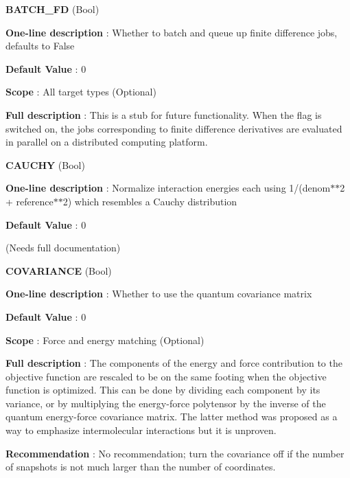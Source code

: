 \begin{DoxyItemize}
\item {\bfseries  \-B\-A\-T\-C\-H\-\_\-\-F\-D } (\-Bool) \par
{\bfseries  \-One-\/line description }\-: \-Whether to batch and queue up finite difference jobs, defaults to \-False \par
{\bfseries  \-Default \-Value }\-: 0 \par
{\bfseries  \-Scope }\-: \-All target types (\-Optional) \par
{\bfseries  \-Full description }\-: \-This is a stub for future functionality. \-When the flag is switched on, the jobs corresponding to finite difference derivatives are evaluated in parallel on a distributed computing platform.\end{DoxyItemize}
\begin{DoxyItemize}
\item {\bfseries  \-C\-A\-U\-C\-H\-Y } (\-Bool) \par
{\bfseries  \-One-\/line description }\-: \-Normalize interaction energies each using 1/(denom$\ast$$\ast$2 + reference$\ast$$\ast$2) which resembles a \-Cauchy distribution \par
{\bfseries  \-Default \-Value }\-: 0 \par
(\-Needs full documentation)\end{DoxyItemize}
\begin{DoxyItemize}
\item {\bfseries  \-C\-O\-V\-A\-R\-I\-A\-N\-C\-E } (\-Bool) \par
{\bfseries  \-One-\/line description }\-: \-Whether to use the quantum covariance matrix \par
{\bfseries  \-Default \-Value }\-: 0 \par
{\bfseries  \-Scope }\-: \-Force and energy matching (\-Optional) \par
{\bfseries  \-Full description }\-: \-The components of the energy and force contribution to the objective function are rescaled to be on the same footing when the objective function is optimized. \-This can be done by dividing each component by its variance, or by multiplying the energy-\/force polytensor by the inverse of the quantum energy-\/force covariance matrix. \-The latter method was proposed as a way to emphasize intermolecular interactions but it is unproven. \par
{\bfseries  \-Recommendation }\-: \-No recommendation; turn the covariance off if the number of snapshots is not much larger than the number of coordinates.\end{DoxyItemize}
